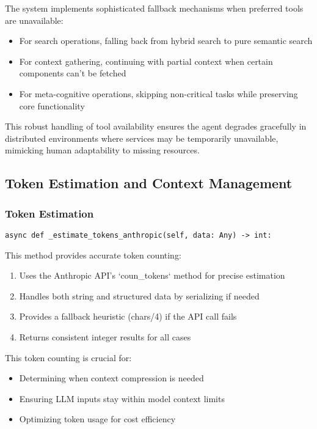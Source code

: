 \documentclass[12pt,a4paper]{article}
\begin{document}
The system implements sophisticated fallback mechanisms when preferred tools are unavailable:
\begin{itemize}
    \item For search operations, falling back from hybrid search to pure semantic search
    \item For context gathering, continuing with partial context when certain components can't be fetched
    \item For meta-cognitive operations, skipping non-critical tasks while preserving core functionality
\end{itemize}

This robust handling of tool availability ensures the agent degrades gracefully in distributed environments where services may be temporarily unavailable, mimicking human adaptability to missing resources.

\subsection*{Token Estimation and Context Management}

\subsubsection*{Token Estimation}
\begin{pageablecode}
\begin{verbatim}
async def _estimate_tokens_anthropic(self, data: Any) -> int:
\end{verbatim}
\end{pageablecode}
This method provides accurate token counting:
\begin{enumerate}[label=\arabic*.]
    \item Uses the Anthropic API's `coun\1\_tokens` method for precise estimation
    \item Handles both string and structured data by serializing if needed
    \item Provides a fallback heuristic (chars/4) if the API call fails
    \item Returns consistent integer results for all cases
\end{enumerate}
This token counting is crucial for:
\begin{itemize}
    \item Determining when context compression is needed
    \item Ensuring LLM inputs stay within model context limits
    \item Optimizing token usage for cost efficiency
\end{itemize}
\end{document}
